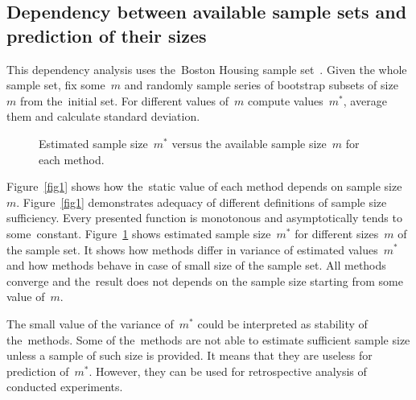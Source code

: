 \documentclass[
11pt,%
tightenlines,%
twoside,%
onecolumn,%
nofloats,%
nobibnotes,%
nofootinbib,%
superscriptaddress,%
noshowpacs,%
centertags]%
{revtex4}
\begin{document}
\subsection{Dependency between available sample sets and prediction of their sizes}
This dependency analysis uses the~Boston Housing sample set~\cite{boston}. Given the whole sample set, fix some~$m$ and randomly sample series of bootstrap subsets of size~$m$ from the~initial set. For different values of~$m$ compute values~$m^*$, average them and calculate standard deviation. 
 
\begin{figure}[!htp]
 \caption{Estimated sample size~$m^*$ versus the available sample size~$m$ for each method.}
\label{fig2}
\end{figure}

Figure~\ref{fig1} shows how the~static value of each method depends on sample size~$m$. %
Figure~\ref{fig1} demonstrates adequacy of different definitions of sample size sufficiency. Every presented function is monotonous and asymptotically tends to some~constant. Figure~\ref{fig2} shows estimated sample size~$m^*$ for  different sizes~$m$ of the sample set. It shows how methods differ in variance  of estimated values~$m^*$ and how methods behave in case of small size of the sample set. All methods converge and the~result does not depends on the sample size starting from some value of~$m$. 

The small value of the variance of~$m^*$ could be interpreted as stability of the~methods. 
Some of the~methods are not able to estimate sufficient sample size unless a sample of  such size is provided. It means that they are useless for prediction of~$m^*$. However, they can be used for retrospective analysis of conducted experiments.
\end{document}
